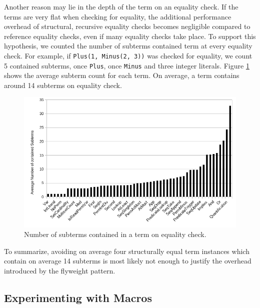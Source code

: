 \documentclass[11pt]{article}
\begin{document}
    Another reason may lie in the depth of the term on an equality check. If
    the terms are very flat when checking for equality, the additional performance overhead of structural, recursive equality checks becomes negligible compared to reference equality checks, even
    if many equality checks take place. To support this hypothesis, we counted the number of subterms
    contained term at every equality check. For example, if \texttt{Plus(1, Minus(2, 3))} was checked for equality,
    we count 5 contained subterms, once \texttt{Plus}, once \texttt{Minus} and three integer literals.
    Figure \ref{fig:node-count} shows the average subterm count for each term. On average,
    a term contains around 14 subterms on equality check.

    \begin{figure}[H]
        \includegraphics[width=\linewidth]{node-count.png}
        \caption{Number of subterms contained in a term on equality check.}
        \label{fig:node-count}
    \end{figure}

    To summarize, avoiding on average four structurally equal term instances which contain
    on average 14 subterms is most likely not enough to justify the overhead introduced by the flyweight pattern.



    \subsection{Experimenting with Macros}
\end{document}
